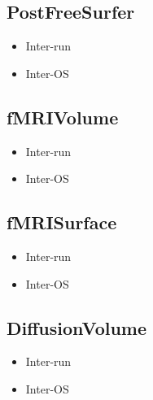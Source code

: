 \subsection{PostFreeSurfer}
\begin{itemize}
    \item Inter-run
    \item Inter-OS
  \end{itemize}
  
\subsection{fMRIVolume}
\begin{itemize}
    \item Inter-run
    \item Inter-OS
  \end{itemize}
  
\subsection{fMRISurface}
\begin{itemize}
    \item Inter-run
    \item Inter-OS
  \end{itemize}
  
\subsection{DiffusionVolume}
\begin{itemize}
    \item Inter-run
    \item Inter-OS
  \end{itemize}

